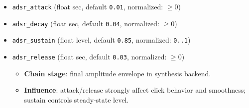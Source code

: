 \documentclass[11pt,a4paper]{article}
\begin{document}
\begin{itemize}
  \item \texttt{adsr\_attack} (float sec, default \texttt{0.01}, normalized: $\ge 0$)
  \item \texttt{adsr\_decay} (float sec, default \texttt{0.04}, normalized: $\ge 0$)
  \item \texttt{adsr\_sustain} (float level, default \texttt{0.85}, normalized: \texttt{0..1})
  \item \texttt{adsr\_release} (float sec, default \texttt{0.03}, normalized: $\ge 0$)
  \begin{itemize}
    \item \textbf{Chain stage}: final amplitude envelope in synthesis backend.
    \item \textbf{Influence}: attack/release strongly affect click behavior and smoothness; sustain controls steady-state level.
  \end{itemize}
\end{itemize}
\end{document}
